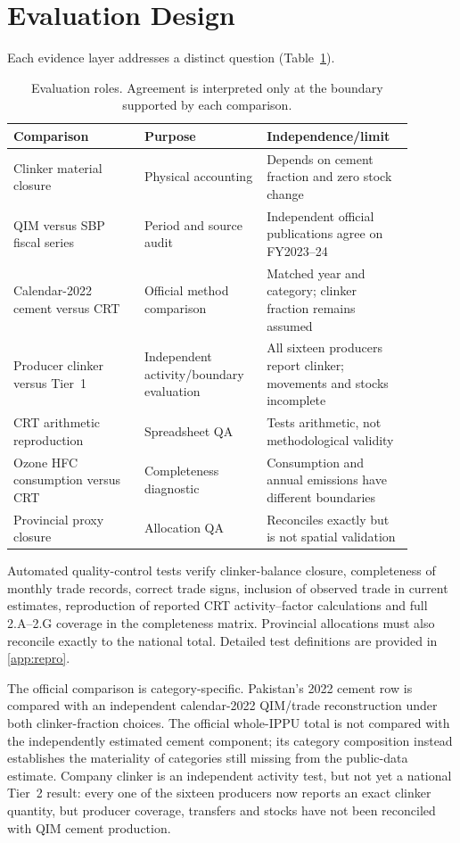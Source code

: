 \section{Evaluation Design}
\label{sec:validation}

Each evidence layer addresses a distinct question (Table~\ref{tab:evidence}).

\begin{table}[htbp]
\centering
\footnotesize
\begin{tabular}{@{}p{0.30\linewidth}p{0.29\linewidth}p{0.30\linewidth}@{}}
\toprule
\textbf{Comparison} & \textbf{Purpose} & \textbf{Independence/limit} \\
\midrule
Clinker material closure & Physical accounting & Depends on cement fraction and zero stock change \\
QIM versus SBP fiscal series & Period and source audit & Independent official publications agree on FY2023--24 \\
Calendar-2022 cement versus CRT & Official method comparison & Matched year and category; clinker fraction remains assumed \\
Producer clinker versus Tier~1 & Independent activity/boundary evaluation & All sixteen producers report clinker; movements and stocks incomplete \\
CRT arithmetic reproduction & Spreadsheet QA & Tests arithmetic, not methodological validity \\
Ozone HFC consumption versus CRT & Completeness diagnostic & Consumption and annual emissions have different boundaries \\
Provincial proxy closure & Allocation QA & Reconciles exactly but is not spatial validation \\
\bottomrule
\end{tabular}
\caption{Evaluation roles. Agreement is interpreted only at the boundary supported by each
comparison.}
\label{tab:evidence}
\end{table}

Automated quality-control tests verify clinker-balance closure, completeness of monthly trade
records, correct trade signs, inclusion of observed trade in current estimates, reproduction
of reported CRT activity--factor calculations and full 2.A--2.G coverage in the completeness
matrix. Provincial allocations must also reconcile exactly to the national total. Detailed
test definitions are provided in \ref{app:repro}.

The official comparison is category-specific. Pakistan's 2022 cement row is compared with an
independent calendar-2022 QIM/trade reconstruction under both clinker-fraction choices. The
official whole-IPPU total is not compared with the independently estimated cement component;
its category composition instead establishes the materiality of categories still missing from
the public-data estimate. Company clinker is an independent activity test, but not yet a
national Tier~2 result: every one of the sixteen producers now reports an exact clinker
quantity, but producer coverage, transfers and stocks have not been reconciled with QIM
cement production.
